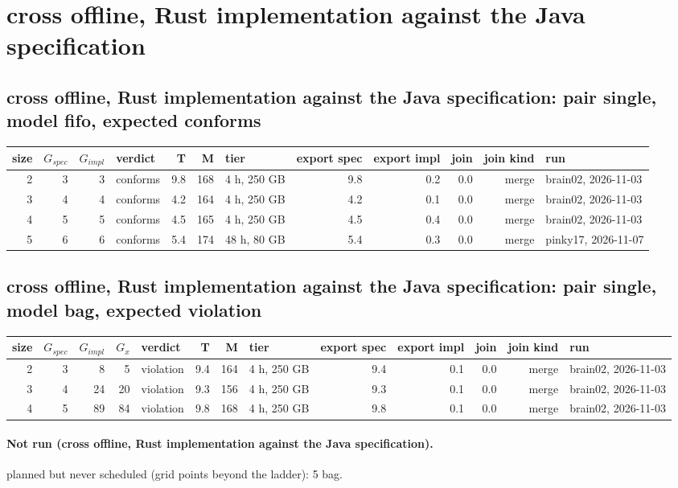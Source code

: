 \documentclass[10pt]{article}
\begin{document}
\section*{cross offline, Rust implementation against the Java specification}
\subsection*{cross offline, Rust implementation against the Java specification: pair \textsf{single}, model fifo, expected conforms}
\begin{longtable}{@{}rrrlrrlrrrrl@{}}
\toprule
size & $G_{\mathit{spec}}$ & $G_{\mathit{impl}}$ & verdict & T & M & tier & export spec & export impl & join & join kind & run \\
\midrule
\endhead
\color{blue} 2 & 3 & 3 & conforms & 9.8 & 168 & 4 h, 250 GB & 9.8 & 0.2 & 0.0 & merge & brain02, 2026-11-03 \\
\color{blue} 3 & 4 & 4 & conforms & 4.2 & 164 & 4 h, 250 GB & 4.2 & 0.1 & 0.0 & merge & brain02, 2026-11-03 \\
\color{blue} 4 & 5 & 5 & conforms & 4.5 & 165 & 4 h, 250 GB & 4.5 & 0.4 & 0.0 & merge & brain02, 2026-11-03 \\
\color{red} 5 & 6 & 6 & conforms & 5.4 & 174 & 48 h, 80 GB & 5.4 & 0.3 & 0.0 & merge & pinky17, 2026-11-07 \\
\bottomrule
\end{longtable}
\subsection*{cross offline, Rust implementation against the Java specification: pair \textsf{single}, model bag, expected violation}
\begin{longtable}{@{}rrrrlrrlrrrrl@{}}
\toprule
size & $G_{\mathit{spec}}$ & $G_{\mathit{impl}}$ & $G_x$ & verdict & T & M & tier & export spec & export impl & join & join kind & run \\
\midrule
\endhead
\color{blue} 2 & 3 & 8 & 5 & violation & 9.4 & 164 & 4 h, 250 GB & 9.4 & 0.1 & 0.0 & merge & brain02, 2026-11-03 \\
\color{blue} 3 & 4 & 24 & 20 & violation & 9.3 & 156 & 4 h, 250 GB & 9.3 & 0.1 & 0.0 & merge & brain02, 2026-11-03 \\
\color{blue} 4 & 5 & 89 & 84 & violation & 9.8 & 168 & 4 h, 250 GB & 9.8 & 0.1 & 0.0 & merge & brain02, 2026-11-03 \\
\bottomrule
\end{longtable}
\paragraph{Not run (cross offline, Rust implementation against the Java specification).}
planned but never scheduled (grid points beyond the ladder): 5 bag.\par
\end{document}
